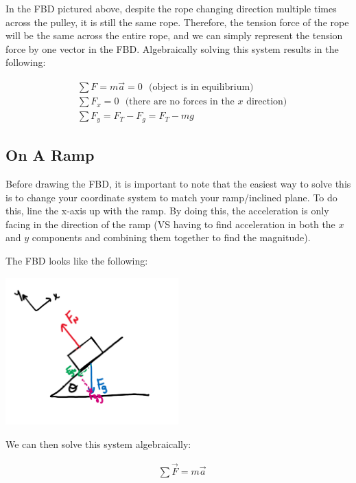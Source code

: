In the FBD pictured above, despite the rope changing direction multiple times across the pulley, it is still the same rope. Therefore, the tension force of the rope will be the same across the entire rope, and we can simply represent the tension force by one vector in the FBD. Algebraically solving this system results in the following:

$$
	\begin{aligned}
		&\sum F = m\vec{a} = 0 \:\:\:\text{(object is in equilibrium)}\\
		&\sum F_x = 0 \:\:\:\text{(there are no forces in the $x$ direction)}\\
		&\sum F_y = F_T - F_g = F_T - mg
	\end{aligned}
$$

\subsection*{On A Ramp}

Before drawing the FBD, it is important to note that the easiest way to solve this is to change your coordinate system to match your ramp/inclined plane. To do this, line the x-axis up with the ramp. By doing this, the acceleration is only facing in the direction of the ramp (VS having to find acceleration in both the $x$ and $y$ components and combining them together to find the magnitude).\newpage

The FBD looks like the following:

\begin{center}
	\includegraphics[width=0.5\textwidth]{chapters/ch3/images/fig3_4.PNG}
\end{center}

We can then solve this system algebraically:

$$
	\begin{aligned}
		&\sum \vec F = m\vec{a}\\
	\end{aligned}
$$

